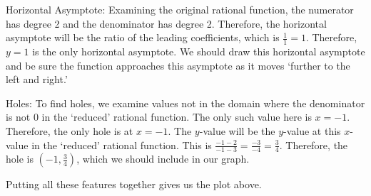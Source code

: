 \documentclass[11pt,letterpaper]{article}
\begin{document}
{Horizontal Asymptote: Examining the original rational function, the numerator has degree 2 and the denominator has degree 2. Therefore, the horizontal asymptote will be the ratio of the leading coefficients, which is $\tfrac{1}{1}= 1$. Therefore, $y= 1$ is the only horizontal asymptote. We should draw this horizontal asymptote and be sure the function approaches this asymptote as it moves `further to the left and right.' \par\vspace{0.3cm}

Holes: To find holes, we examine values not in the domain where the denominator is not 0 in the `reduced' rational function. The only such value here is $x= -1$. Therefore, the only hole is at $x= -1$. The $y$-value will be the $y$-value at this $x$-value in the `reduced' rational function. This is $\tfrac{-1 - 2}{-1 - 3}= \tfrac{-3}{-4}= \tfrac{3}{4}$. Therefore, the hole is $(-1, \tfrac{3}{4})$, which we should include in our graph. \par\vspace{0.3cm}

Putting all these features together gives us the plot above.
}
\end{document}
